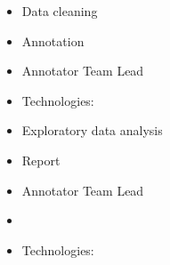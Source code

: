 \documentclass[10pt,a4paper,ragged2e]{altacv}
\begin{document}
\begin{itemize}
	\item Data cleaning
	\item Annotation
	\item Annotator Team Lead
	\subitem 
	\subitem 
	\item Technologies: 
\end{itemize}

\begin{itemize}
	\item Exploratory data analysis
	\item Report
	\item Annotator Team Lead
	\item 
	\subitem 
	\subitem 
	\item Technologies: 
\end{itemize}


\end{document}

